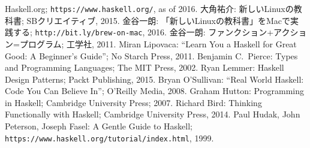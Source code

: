 \documentclass[a4paper,twocolumn]{jsbook}
\begin{document}
\begin{thebibliography}{99}
 Haskell.org; \texttt{https://www.haskell.org/}, as of 2016.
 大角祐介: 新しいLinuxの教科書; SBクリエイティブ, 2015.
 金谷一朗: 「新しいLinuxの教科書」をMacで実践する; \texttt{http://bit.ly/brew-on-mac}, 2016.
 金谷一朗: ファンクション+アクション=プログラム; 工学社, 2011.
Miran Lipovaca: ``Learn You a Haskell for Great Good: A Beginner's Guide''; No Starch Press, 2011.
 Benjamin C.~Pierce: Types and Programming Languages; The MIT Press, 2002.
 Ryan Lemmer: Haskell Design Patterns; Packt Publishing, 2015.
 Bryan O'Sullivan: ``Real World Haskell: Code You Can Believe In''; O'Reilly Media, 2008.
 Graham Hutton: Programming in Haskell; Cambridge University Press; 2007.
 Richard Bird: Thinking Functionally with Haskell; Cambridge University Press, 2014.
 Paul Hudak, John Peterson, Joseph Fasel: A Gentle Guide to Haskell; \texttt{https://www.haskell.org/tutorial/index.html}, 1999.
\end{thebibliography}
\end{document}

